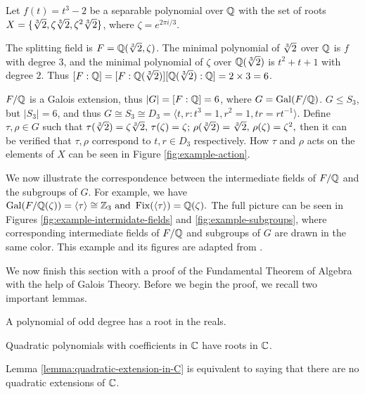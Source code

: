 \begin{example} \label{exm:correspondence}
	
	Let $f(t) = t^3 - 2$ be a separable polynomial over $\mathbb Q$ with the set of roots $X = \{ \sqrt[3]{2}, \zeta \sqrt[3]{2}, \zeta^2 \sqrt[3]{2} \}$, where $\zeta = e^{2\pi i / 3}$. 
	
	The splitting field is $F = \mathbb Q(\sqrt[3]{2}, \zeta)$. The minimal polynomial of $\sqrt[3]{2}$ over $\mathbb Q$ is $f$ with degree $3$, and the minimal polynomial of $\zeta$ over $\mathbb Q(\sqrt[3]{2})$ is $t^2 + t + 1$ with degree $2$. Thus $[F : \mathbb Q] = [F : \mathbb Q(\sqrt[3]{2})] [\mathbb Q(\sqrt[3]{2}) : \mathbb Q] = 2 \times 3 = 6$. 
	
	$F / \mathbb Q$ is a Galois extension, thus $|G| = [F : \mathbb Q] = 6$, where $G = \operatorname{Gal}(F / \mathbb Q)$. $G \le S_3$, but $|S_3| = 6$, and thus $G \cong S_3 \cong D_3 = \langle t, r : t^3 = 1, r^2 = 1, tr = rt^{-1} \rangle$. Define $\tau, \rho \in G$ such that 
	$
		\tau(\sqrt[3]{2}) = \zeta \sqrt[3]{2}, \, \tau(\zeta) = \zeta; \, \rho(\sqrt[3]{2}) = \sqrt[3]{2}, \,  \rho(\zeta) = \zeta ^ 2,
	$
	then it can be verified that $\tau, \rho$ correspond to $t, r \in D_3$ respectively. How $\tau$ and $\rho$ acts on the elements of $X$ can be seen in Figure \ref{fig:example-action}.
	
	We now illustrate the correspondence between the intermediate fields of $F / \mathbb Q$ and the subgroups of $G$. For example, we have $\operatorname{Gal}(F / \mathbb Q(\zeta)) = \langle \tau \rangle \cong \mathbb Z_3 \text{ and } \operatorname{Fix}(\langle \tau \rangle) = \mathbb Q(\zeta). $ The full picture can be seen in Figures \ref{fig:example-intermidate-fields} and \ref{fig:example-subgroups}, where corresponding intermediate fields of $F / \mathbb Q$ and subgroups of $G$ are drawn in the same color. This example and its figures are adapted from \cite{visual-algebra}. 
	
\end{example}

We now finish this section with a proof of the Fundamental Theorem of Algebra with the help of Galois Theory. Before we begin the proof, we recall two important lemmas.

\begin{lemma}\label{lemma:ood-degree-real-root}
    A polynomial of odd degree has a root in the reals.
\end{lemma}

\begin{lemma}\label{lemma:quadratic-extension-in-C}
    Quadratic polynomials with coefficients in $\mathbb C$ have roots in $\mathbb C$.
\end{lemma}

Lemma \ref{lemma:quadratic-extension-in-C} is equivalent to saying that there are no quadratic extensions of $\mathbb C$.

